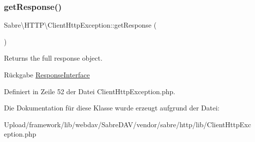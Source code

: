 \subsubsection{\texorpdfstring{get\+Response()}{getResponse()}}
{\footnotesize\ttfamily Sabre\textbackslash{}\+H\+T\+T\+P\textbackslash{}\+Client\+Http\+Exception\+::get\+Response (\begin{DoxyParamCaption}{ }\end{DoxyParamCaption})}

Returns the full response object.

\begin{DoxyReturn}{Rückgabe}
\mbox{\hyperlink{interface_sabre_1_1_h_t_t_p_1_1_response_interface}{Response\+Interface}} 
\end{DoxyReturn}


Definiert in Zeile 52 der Datei Client\+Http\+Exception.\+php.



Die Dokumentation für diese Klasse wurde erzeugt aufgrund der Datei\+:\begin{DoxyCompactItemize}
\item 
Upload/framework/lib/webdav/\+Sabre\+D\+A\+V/vendor/sabre/http/lib/Client\+Http\+Exception.\+php\end{DoxyCompactItemize}
